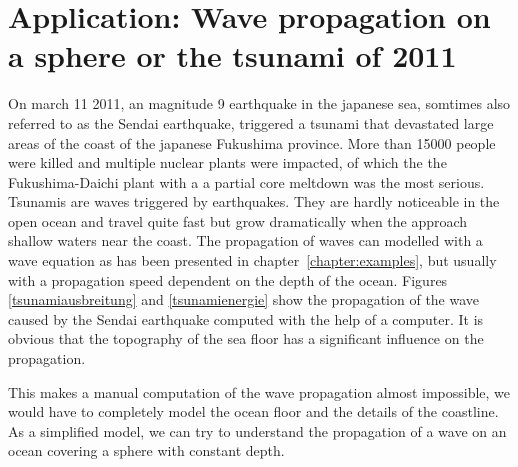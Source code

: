 %
%
%

\section{Application: Wave propagation on a sphere or the tsunami of 2011}
On march 11 2011, an magnitude 9 earthquake in the japanese sea,
somtimes also referred to as the Sendai earthquake, triggered a 
tsunami that devastated large areas of the coast of the japanese
Fukushima province.
More than 15000 people were killed and multiple nuclear plants
were impacted, of which the the Fukushima-Daichi plant with a
a partial core meltdown was the most serious.
Tsunamis are waves triggered by earthquakes.
They are hardly noticeable in the open ocean and travel quite fast
but grow dramatically when the approach shallow waters near the coast.
The propagation of waves can modelled with a wave equation as has
been presented in chapter~\ref{chapter:examples}, but usually with
a propagation speed dependent on the depth of the ocean.
Figures \ref{tsunamiausbreitung} and \ref{tsunamienergie}
show the propagation of the wave caused by the Sendai earthquake
computed with the help of a computer.
It is obvious that the topography of the sea floor has a significant
influence on the propagation.

This makes a manual computation of the wave propagation almost
impossible, we would have to completely model the ocean floor and
the details of the coastline.
As a simplified model, we can try to understand the propagation of a
wave on an ocean covering a sphere with constant depth.

